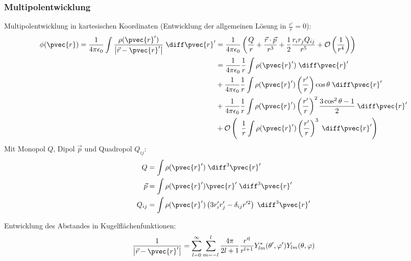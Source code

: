 \documentclass[11pt]{article}
\numberwithin{equation}{section}
\begin{document}
			\subsubsection{Multipolentwicklung}
				\noindent
				Multipolentwicklung in kartesischen Koordinaten (Entwicklung der allgemeinen Lösung in $\frac{r'}{r}=0$):
				\begin{equation}
					\begin{aligned}
						\phi(\pvec{r}) = \frac{1}{4\pi\epsilon_0}\int\frac{\rho(\pvec{r}')}{\left|\vec{r}-\pvec{r}'\right|}\;\diff \pvec{r}'
						&= \frac{1}{4\pi\epsilon_0}\left(\frac{Q}{r} + \frac{\vec{r}\cdot\vec{p}}{r^3} + \frac{1}{2}\frac{r_i r_j Q_{ij}}{r^5} + \mathcal{O} \left(\frac{1}{r^4}\right)\right) \\
						&= \frac{1}{4\pi\epsilon_0}\frac{1}{r}\int\rho(\pvec{r}')\;\diff \pvec{r}' \\
						&+ \frac{1}{4\pi\epsilon_0}\frac{1}{r}\int\rho(\pvec{r}')\left(\frac{r'}{r}\right)\cos\theta\;\diff \pvec{r}' \\
						&+ \frac{1}{4\pi\epsilon_0}\frac{1}{r}\int\rho(\pvec{r}')\left(\frac{r'}{r}\right)^2\frac{3\cos^2\theta-1}{2}\;\diff \pvec{r}' \\
						&+ \mathcal{O}\left(\;\;\frac{1}{r}\int\rho(\pvec{r}')\left(\frac{r'}{r}\right)^3 \;\diff \pvec{r}'\right) \\
					\end{aligned}
				\end{equation}
				Mit Monopol $Q$, Dipol $\vec{p}$ und Quadropol $Q_{ij}$:
				\begin{equation}
					\begin{aligned}
						Q &= \int \rho(\pvec{r}') \;\diff^3 \pvec{r}' \\
						\vec{p} &= \int \rho(\pvec{r}')\pvec{r}' \;\diff^3 \pvec{r}' \\
						Q_{ij} &= \int \rho(\pvec{r}')\left(3r'_i r'_j - \delta_{ij} r'^2 \right)	\;\diff^3 \pvec{r}' \\
					\end{aligned}
				\end{equation}

				\noindent
				Entwicklung des Abstandes in Kugelflächenfunktionen:
				\begin{equation}
					\frac{1}{\left|\vec{r}-\pvec{r}'\right|}=\sum_{l=0}^{\infty}\sum_{m=-l}^{l} \frac{4\pi}{2l+1}\frac{r'^l}{r^{l+1}} Y^{*}_{lm}(\theta',\varphi')Y_{lm}(\theta,\varphi)
				\end{equation}
\end{document}
